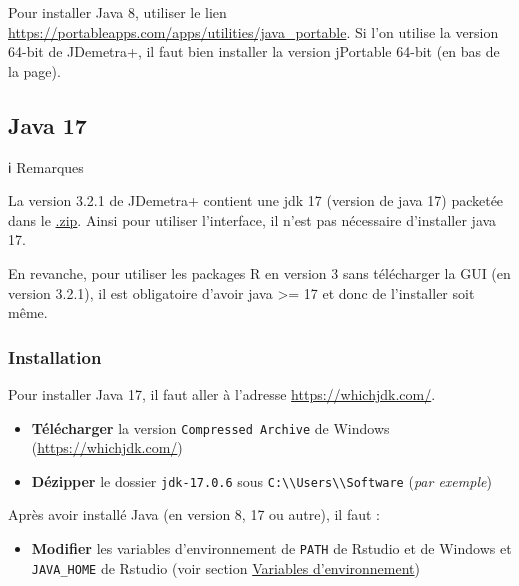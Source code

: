 \documentclass[
]{article}
\providecommand{\tightlist}{%
  \setlength{\itemsep}{0pt}\setlength{\parskip}{0pt}}
\begin{document}
Pour installer Java 8, utiliser le lien
\textcolor{html_color}{\url{https://portableapps.com/apps/utilities/java_portable}}.
Si l'on utilise la version 64-bit de JDemetra+, il faut bien installer
la version jPortable 64-bit (en bas de la page).

\hypertarget{java-17}{%
\subsection{Java 17}\label{java-17}}

ℹ️ Remarques

La version 3.2.1 de JDemetra+ contient une jdk 17 (version de java 17)
packetée dans le
\href{https://github.com/jdemetra/jdplus-main/releases/tag/v3.2.1}{.zip}.
Ainsi pour utiliser l'interface, il n'est pas nécessaire d'installer
java 17.

En revanche, pour utiliser les packages R en version 3 sans télécharger
la GUI (en version 3.2.1), il est obligatoire d'avoir java \textgreater=
17 et donc de l'installer soit même.

\hypertarget{installation}{%
\subsubsection{Installation}\label{installation}}

Pour installer Java 17, il faut aller à l'adresse
\textcolor{html_color}{\url{https://whichjdk.com/}}.

\begin{itemize}
\tightlist
\item
  \textbf{Télécharger} la version \texttt{Compressed\ Archive} de
  Windows (\textcolor{html_color}{\url{https://whichjdk.com/}})
\item
  \textbf{Dézipper} le dossier
  \textcolor{windows_path_color}{\nolinkurl{jdk-17.0.6}} sous
  \textcolor{windows_path_color}{\nolinkurl{C:\\Users\\Software}}
  (\emph{par exemple})
\end{itemize}

Après avoir installé Java (en version 8, 17 ou autre), il faut :

\begin{itemize}
\tightlist
\item
  \textbf{Modifier} les variables d'environnement de \texttt{PATH} de
  Rstudio et de Windows et \texttt{JAVA\_HOME} de Rstudio (voir section
  \protect\hyperlink{var_env}{Variables d'environnement})
\end{itemize}
\end{document}
